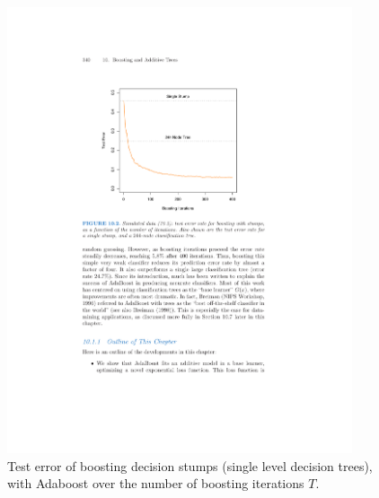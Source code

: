 \documentclass[11pt]{article}
\begin{document}
\begin{figure}[H]
  \centering
  \includegraphics[width=4in]{adaboost_stumps.pdf}
  \caption{Test error of boosting decision stumps (single level decision
  trees), with Adaboost over the number of boosting iterations $T$.}
\end{figure}



%
%
%
%
%
%
%
%
%
\end{document}
